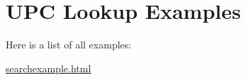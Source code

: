 \section{UPC Lookup Examples}
Here is a list of all examples:\begin{CompactItemize}
\item 
\hyperlink{searchexample_8html-example}{searchexample.html}
\end{CompactItemize}
